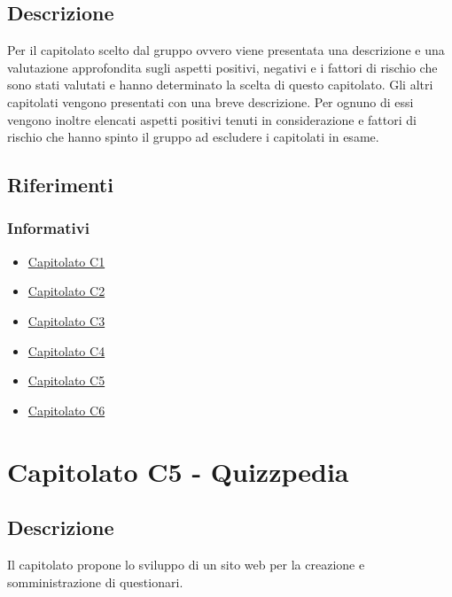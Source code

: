 \documentclass[12pt,a4paper]{article}
\begin{document}
\subsection{Descrizione}
Per il capitolato scelto dal gruppo ovvero  viene presentata una descrizione e una valutazione approfondita sugli aspetti positivi, negativi e i fattori di rischio che sono stati valutati e hanno determinato la scelta di questo capitolato. Gli altri capitolati vengono presentati con una breve descrizione. Per ognuno di essi vengono inoltre elencati aspetti positivi tenuti in considerazione e fattori di rischio che hanno spinto il gruppo ad escludere i capitolati in esame.

\subsection{Riferimenti}
\subsubsection{Informativi}

\begin{itemize}
\item \href{http://www.math.unipd.it/~tullio/IS-1/2015/Progetto/C1.pdf}{Capitolato C1}
\item \href{http://www.math.unipd.it/~tullio/IS-1/2015/Progetto/C2.pdf}{Capitolato C2}
\item \href{http://www.math.unipd.it/~tullio/IS-1/2015/Progetto/C3.pdf}{Capitolato C3}
\item \href{http://www.math.unipd.it/~tullio/IS-1/2015/Progetto/C4.pdf}{Capitolato C4}
\item \href{http://www.math.unipd.it/~tullio/IS-1/2015/Progetto/C5.pdf}{Capitolato C5}
\item \href{http://www.math.unipd.it/~tullio/IS-1/2015/Progetto/C6.pdf}{Capitolato C6}
\end{itemize}


\newpage
\section{Capitolato C5 - Quizzpedia}
\subsection{Descrizione}

Il capitolato propone lo sviluppo di un sito web per la creazione e somministrazione di questionari.
\end{document}
